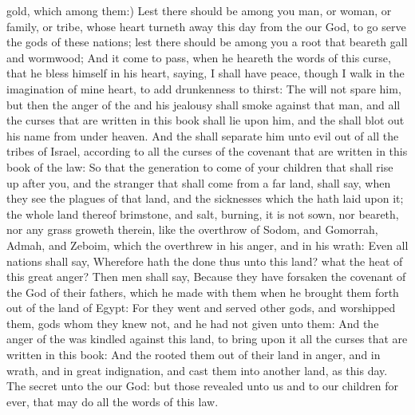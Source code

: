 {gold, which
{} among them:)
Lest there should
be among you
man, or
woman, or
family, or
tribe, whose
heart turneth
away this
day from the
{} our
God, to
go
{}
serve the
gods of these
nations; lest there should
be among you a
root that
beareth
gall and
wormwood;
And it come to pass, when he
heareth the
words of this
curse, that he
bless himself in his
heart,
saying, I shall have
peace,
though I
walk in the
imagination of mine
heart, to
add
drunkenness to
thirst:
The
{}
will not
spare him, but then the
anger of the
{} and his
jealousy shall
smoke against that
man, and all the
curses that are
written in this
book shall
lie upon him, and the
{} shall blot
out his
name from under
heaven.
And the
{} shall
separate him unto
evil out of all the
tribes of
Israel, according to all the
curses of the
covenant that are
written in this
book of the
law:
So that the
generation to
come of your
children that shall rise
up
after you, and the
stranger that shall
come from a
far
land, shall
say, when they
see the
plagues of that
land, and the
sicknesses which the
{} hath
laid upon it;
 the whole
land thereof
{}
brimstone, and
salt,
{}
burning,
{} it is not
sown, nor
beareth, nor any
grass
groweth therein, like the
overthrow of
Sodom, and
Gomorrah,
Admah, and
Zeboim, which the
{}
overthrew in his
anger, and in his
wrath:
Even all
nations shall
say, Wherefore hath the
{}
done thus unto this
land? what
{} the
heat of this
great
anger?
Then men shall
say, Because they have
forsaken the
covenant of the
{}
God of their
fathers, which he
made with them when he brought them
forth out of the
land of
Egypt:
For they
went and
served
other
gods, and
worshipped them,
gods whom they
knew not, and
{} he had not
given unto them:
And the
anger of the
{} was
kindled against this
land, to
bring upon it all the
curses that are
written in this
book:
And the
{}
rooted them out of their
land in
anger, and in
wrath, and in
great
indignation, and
cast them into
another
land, as
{} this
day.
The
secret
{} unto the
{} our
God: but those
{}
revealed
{} unto us and to our
children
for
ever, that
{} may
do all the
words of this
law.

}
